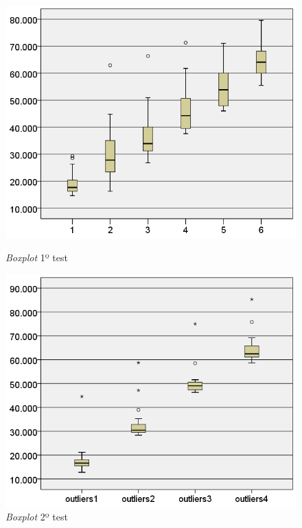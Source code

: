 \documentclass[letterpaper, 10 pt, conference]{ieeeconf}  %
\begin{document}
\begin{figure}[ht]
    \centering
    \begin{minipage}[b]{0.32\textwidth}
        \centering
        \includegraphics[width=\textwidth]{Figures/boxplot1_large.png}
        \caption{\textit{Boxplot} 1º test}
            \label{fig:boxplot1}
    \end{minipage}
    \hfill
    \begin{minipage}[b]{0.32\textwidth}
        \centering
        \includegraphics[width=\textwidth]{Figures/boxplot2_large.png}
        \caption{\textit{Boxplot} 2º test}
            \label{fig:boxplot2}

\end{minipage}
\end{figure}
\end{document}
